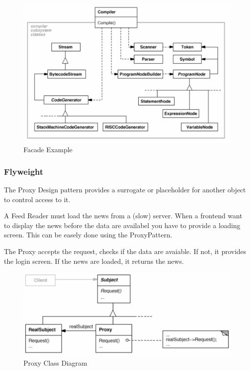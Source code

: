 \documentclass[11pt]{article}
\begin{document}
\begin{figure}[htbp]
\centering
\includegraphics[width=.9\linewidth]{img/facade_example.png}
\caption{\label{fig:facade-example}Facade Example}
\end{figure}
\subsubsection{Flyweight}
\label{sec:org756e250}

The Proxy Design pattern provides a surrogate or placeholder for another object to control access to it.

A Feed Reader must load the news from a (slow) server.
When a frontend want to display the news before the data are availabel you have to provide a loading screen.
This can be easely done using the ProxyPattern.

The Proxy accepts the request, checks if the data are avaiable.
If not, it provides the login screen.
If the news are loaded, it returns the news.


\begin{figure}[htbp]
\centering
\includegraphics[width=.9\linewidth]{img/proxy.png}
\caption{\label{fig:proxy-class-diagram}Proxy Class Diagram}
\end{figure}
\end{document}
